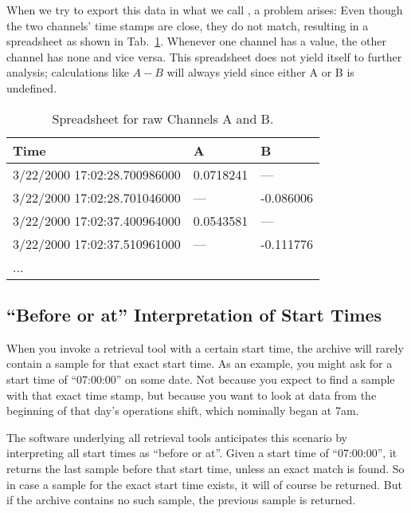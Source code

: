\noindent When we try to export this data in what we call , a problem arises: Even though the two channels'
time stamps are close, they do not match, resulting in a spreadsheet
as shown in Tab.~\ref{tab:ABraw}. Whenever one channel has a value,
the other channel has none and vice versa.  This spreadsheet does
not yield itself to further analysis; calculations like $A-B$ will
always yield  since either A or B is undefined.

\begin{table}[htbp]
  \begin{center}
    \sffamily
    \begin{tabular}[t]{l|l|l}
      Time                         & A         & B         \\
      \hline
      3/22/2000 17:02:28.700986000 & 0.0718241 & ---       \\
      3/22/2000 17:02:28.701046000 & ---       & -0.086006 \\
      3/22/2000 17:02:37.400964000 & 0.0543581 & ---       \\
      3/22/2000 17:02:37.510961000 & ---       & -0.111776 \\
      ...
    \end{tabular}
    \caption{Spreadsheet for raw Channels A and B.}
    \label{tab:ABraw}
  \end{center}
\end{table}

\subsection{``Before or at'' Interpretation of Start Times}
 \label{sec:starttime}
When you invoke a retrieval tool with a certain start time, the
archive will rarely contain a sample for that exact start time. As an
example, you might ask for a start time of ``07:00:00'' on some date. Not
because you expect to find a sample with that exact time stamp, but
because you want to look at data from the beginning of that day's
operations shift, which nominally began at 7am.

The software underlying all retrieval tools anticipates this scenario
by interpreting all start times as ``before or at''. Given a start time
of ``07:00:00'', it returns the last sample before that start
time, unless an exact match is found. So in case a sample for the
exact start time exists, it will of course be returned. But if the
archive contains no such sample, the previous sample is returned.

